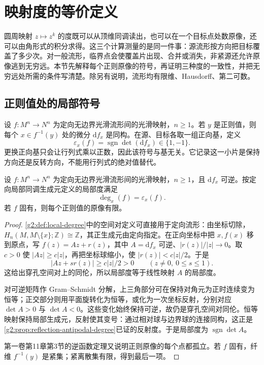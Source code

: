 
% 
% 

\section{映射度的等价定义}
\label{g2:sec:1601}

圆周映射 \(z\mapsto z^k\) 的度既可以从顶维同调读出，也可以在一个目标点处数原像，还可以由角形式的积分求得。这三个计算测量的是同一件事：源流形按方向把目标覆盖了多少次。对一般流形，临界点会使覆盖片出现、合并或消失，非紧源还允许原像逃到无穷远。本节先解释每个正则原像的符号，再证明三种度的一致性，并把无穷远处所需的条件写清楚。除另有说明，流形均有限维、Hausdorff、第二可数。

\subsection{正则值处的局部符号}
\label{g2:subsec:1601:01}

设 \(f:M^n\to N^n\) 为定向无边界光滑流形间的光滑映射，\(n\ge1\)。若 \(y\) 是正则值，则每个 \(x\in f^{-1}(y)\) 处的微分 \(\mathrm{d}f_x\) 是同构。在源、目标各取一组正向基，定义
\[
	\varepsilon_x(f)=\operatorname{sgn}\det(\mathrm{d}f_x)\in\{1,-1\}.
\]
更换正向基只会让行列式乘以正数，因此该符号与基无关。它记录这一小片是保持方向还是反转方向，不能用行列式的绝对值替代。

\begin{proposition}\label{g2:prop:regular-local-degree-sign}
	设 \(f:M^n\to N^n\) 为定向无边界光滑流形间的光滑映射，\(n\ge1\)，且 \(\mathrm{d}f_x\) 可逆。按定向局部同调生成元定义的局部度满足
	\[
		\deg_x(f)=\varepsilon_x(f).
	\]
	若 \(f\) 固有，则每个正则值的原像有限。
\end{proposition}
\begin{proof}
	\cref{g2:def:local-degree}中的空间对定义可直接用于定向流形：由坐标切除，\(H_n(M,M\setminus\{x\};\mathbb Z)\cong\mathbb Z\)，其正生成元由定向指定。在正向坐标中把 \(x,f(x)\) 移到原点，写 \(f(z)=Az+r(z)\)，其中 \(A=\mathrm{d}f_x\) 可逆、\(|r(z)|/|z|\to0\)。取 \(c>0\) 使 \(|Az|\ge c|z|\)，再把坐标球缩小，使 \(|r(z)|<c|z|/2\)。于是
	\[
		|Az+s r(z)|\ge c|z|/2>0\qquad(z\ne0,\ 0\le s\le1).
	\]
	这给出穿孔空间对上的同伦，所以局部度等于线性映射 \(A\) 的局部度。

	对可逆矩阵作 Gram--Schmidt 分解，上三角部分可在保持对角元为正时连续变为恒等；正交部分则用平面旋转化为恒等，或化为一次坐标反射，分别对应 \(\det A>0\) 与 \(\det A<0\)。这些变化始终保持可逆，故仍是穿孔空间对同伦。恒等映射保持局部生成元，反射使其变号：通过相对球与边界球的连接同构，这正是\cref{g2:prop:reflection-antipodal-degree}已证的反射度。于是局部度为 \(\operatorname{sgn}\det A\)。

	第一卷第11章第3节的逆函数定理又说明正则原像的每个点都孤立。若 \(f\) 固有，纤维 \(f^{-1}(y)\) 是紧集；紧离散集有限，得到最后一项。
\end{proof}

